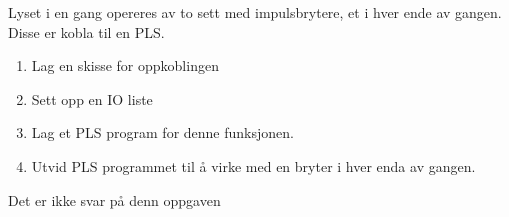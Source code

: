 


Lyset i en gang opereres av to sett med impulsbrytere, et i hver ende
av gangen. Disse er kobla til en PLS.
\begin{enumerate}
\item Lag en skisse for oppkoblingen
\item Sett opp en IO liste
\item Lag et PLS program for denne funksjonen.
\item Utvid PLS programmet til å virke med en bryter i hver enda av gangen. 
\end{enumerate}
\vskip 10pt





Det er ikke svar på denn oppgaven












